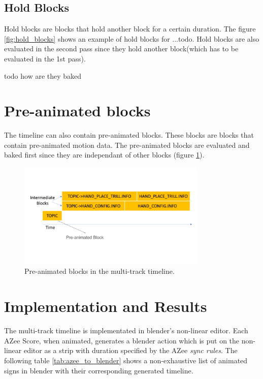 \documentclass[../../main.tex]{subfiles}
\begin{document}
\subsection{Hold Blocks}
\label{ch:multi_track:second_pass:hold_blocks}

Hold blocks are blocks that hold another block for a certain duration. The figure \ref{fig:hold_blocks} shows an example of hold blocks for ...todo. Hold blocks are also evaluated in the second pass since they hold another block(which has to be evaluated in the 1st pass).

todo how are they baked 

\section{Pre-animated blocks}
\label{ch:multi_track:preanim_blocks}

The timeline can also contain pre-animated blocks. These blocks are blocks that contain pre-animated motion data. The pre-animated blocks are evaluated and baked first since they are independant of other blocks (figure \ref{fig:preanim_blocks}).

\begin{figure}[h]
    \centering
    \includegraphics[width=0.8\textwidth]{chapters/multi_track/images/preanim_blocks.png}
    \caption{Pre-animated blocks in the multi-track timeline.}
    \label{fig:preanim_blocks}
\end{figure}

\section{Implementation and Results}
\label{ch:multi_track:implem_results}

The multi-track timeline is implementated in blender's non-linear editor. Each AZee Score, when animated, generates a blender action which is put on the non-linear editor as a strip with duration specified by the AZee \emph{sync rules}. The following table \ref{tab:azee_to_blender} shows a non-exhaustive list of animated signs in blender with their corresponding generated timeline.
\end{document}
